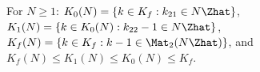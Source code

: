 For $N\ge1$: $K_0(N)=\{k\in K_f:k_{21}\in N\Zhat\}$, $K_1(N)=\{k\in K_0(N):k_{22}-1\in N\Zhat\}$, $K_f(N)=\{k\in K_f:k-1\in\Mat_2(N\Zhat)\}$, and $K_f(N)\le K_1(N)\le K_0(N)\le K_f$.
